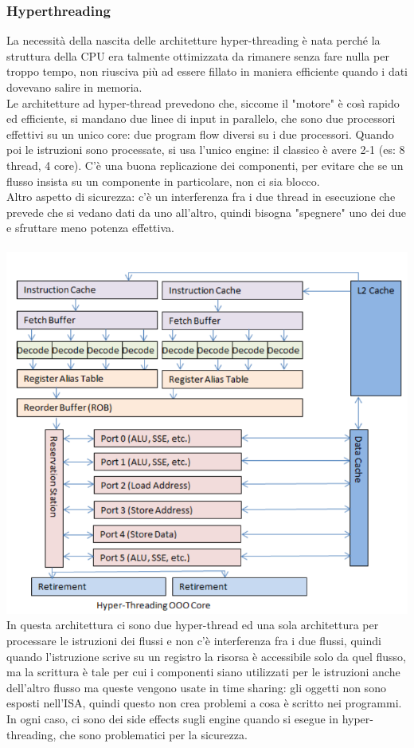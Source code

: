 \documentclass[14pt]{article}
\begin{document}
\subsubsection{Hyperthreading}
La necessità della nascita delle architetture hyper-threading è nata perché la struttura della CPU era talmente ottimizzata da rimanere senza fare nulla per troppo tempo, non riusciva più ad essere fillato in maniera efficiente quando i dati dovevano salire in memoria.\\ Le architetture ad hyper-thread prevedono che, siccome il "motore" è così rapido ed efficiente, si mandano due linee di input in parallelo, che sono due processori effettivi su un unico core: due program flow diversi su i due processori. Quando poi le istruzioni sono processate, si usa l'unico engine: il classico è avere 2-1 (es: 8 thread, 4 core). C'è una buona replicazione dei componenti, per evitare che se un flusso insista su un componente in particolare, non ci sia blocco.\\ Altro aspetto di sicurezza: c'è un interferenza fra i due thread in esecuzione che prevede che si vedano dati da uno all'altro, quindi bisogna "spegnere" uno dei due e sfruttare meno potenza effettiva.
\\\\
\includegraphics[scale=0.3]{immagini/hypert-ooo}\\
In questa architettura ci sono due hyper-thread ed una sola architettura per processare le istruzioni dei flussi e non c'è interferenza fra i due flussi, quindi quando l'istruzione scrive su un registro la risorsa è accessibile solo da quel flusso, ma la scrittura è tale per cui i componenti siano utilizzati per le istruzioni anche dell'altro flusso ma queste vengono usate in time sharing: gli oggetti non sono esposti nell'ISA, quindi questo non crea problemi a cosa è scritto nei programmi. In ogni caso, ci sono dei side effects sugli engine quando si esegue in hyper-threading, che sono problematici per la sicurezza.
\end{document}
